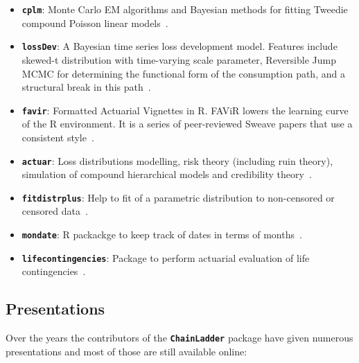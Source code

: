 \documentclass{article}
\newcommand{\chainladder}{\textbf{\texttt{ChainLadder}} }
\begin{document}
\begin{itemize}
\item \textbf{\texttt{cplm}}:  Monte Carlo EM algorithms and Bayesian methods for
  fitting Tweedie compound Poisson linear models~\cite{Zhang2011}.  
  
\item \textbf{\texttt{lossDev}}:  A Bayesian time series loss development
  model. Features include skewed-t distribution with time-varying
  scale parameter, Reversible Jump MCMC for determining the functional
  form of the consumption path, and a structural break in this
  path~\cite{LawsSchmid2011}. 
  
\item \textbf{\texttt{favir}}: Formatted Actuarial Vignettes in R. FAViR lowers the learning
  curve of the R environment. It is a series of peer-reviewed Sweave
  papers that use a consistent style~\cite{Escoto2011}. 
  
\item \textbf{\texttt{actuar}}: Loss distributions modelling, risk theory (including
  ruin theory), simulation of compound hierarchical models and
  credibility theory~\cite{DutangGouletPigeon2008}. 
  
\item \textbf{\texttt{fitdistrplus}}: Help to fit of a parametric distribution to
  non-censored or censored
  data~\cite{Delignette-MullerPouillotDenisDutang2011}.  

\item \textbf{\texttt{mondate}}: R packackge to keep track of dates in terms of
  months~\cite{Murphy2011}. 

\item \textbf{\texttt{lifecontingencies}}: Package to perform actuarial evaluation of
  life contingencies~\cite{Spedicato2011}. 
  
\end{itemize} 


\subsection{Presentations}
Over the years the contributors of the \chainladder package have given
numerous presentations and most of those are still available online:
\end{document}
